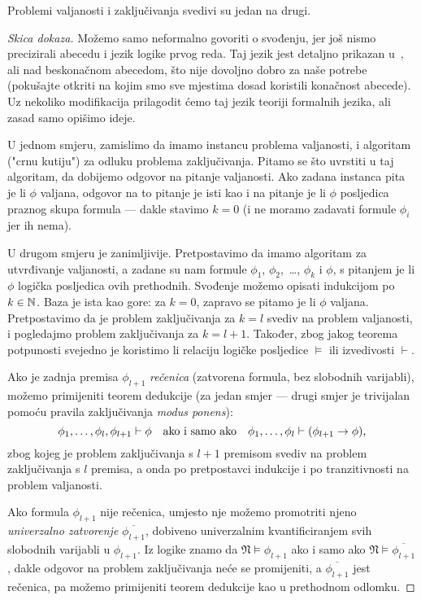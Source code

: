 \begin{propozicija}[{name=[međusobna svedivost valjanosti i zaključivanja]}]\label{pp:valj<>zaklj}
Problemi valjanosti i zaključivanja svedivi su jedan na drugi.
\end{propozicija}
\begin{proof}[Skica dokaza]
Možemo samo neformalno govoriti o svođenju, jer još nismo precizirali abecedu i jezik logike prvog reda. Taj jezik jest detaljno prikazan u~\cite{skr:VukML}, ali nad beskonačnom abecedom, što nije dovoljno dobro za naše potrebe (pokušajte otkriti na kojim smo sve mjestima dosad koristili konačnost abecede). Uz nekoliko modifikacija prilagodit ćemo taj jezik teoriji formalnih jezika, ali zasad samo opišimo ideje.

U jednom smjeru, zamislimo da imamo instancu problema valjanosti, i algoritam ("crnu kutiju") za odluku problema zaključivanja. Pitamo se što uvrstiti u taj algoritam, da dobijemo odgovor na pitanje valjanosti. Ako zadana instanca pita je li $\phi$ valjana, odgovor na to pitanje je isti kao i na pitanje je li $\phi$ posljedica praznog skupa formula --- dakle stavimo $k=0$ (i ne moramo zadavati formule $\phi_i$ jer ih nema).

U drugom smjeru je zanimljivije. Pretpostavimo da imamo algoritam za utvrđivanje valjanosti, a zadane su nam formule $\phi_1$, $\phi_2$,~\ldots, $\phi_k$ i $\phi$, s pitanjem je li $\phi$ logička posljedica ovih prethodnih. Svođenje možemo opisati indukcijom po $k\in{\mathbb N}$. Baza je ista kao gore: za $k=0$, zapravo se pitamo je li $\phi$ valjana. Pretpostavimo da je problem zaključivanja za $k=l$ svediv na problem valjanosti, i pogledajmo problem zaključivanja za $k=l+1$. Također, zbog jakog teorema potpunosti svejedno je koristimo li relaciju logičke posljedice $\models$ ili izvedivosti $\vdash$.

Ako je zadnja premisa $\phi_{l+1}$ \emph{rečenica} (zatvorena formula, bez slobodnih varijabli), možemo primijeniti teorem dedukcije (za jedan smjer --- drugi smjer je trivijalan pomoću pravila zaključivanja \emph{modus ponens}):
\begin{equation}\label{eq:prebaci}
\phi_1,\dotsc,\phi_l,\phi_{l+1}\vdash\phi\text{\quad ako i samo ako\quad}
\phi_1,\dotsc,\phi_l\vdash(\phi_{l+1}\to\phi)\text,
\end{equation}
zbog kojeg je problem zaključivanja s $l+1$ premisom svediv na problem zaključivanja s $l$ premisa, a onda po pretpostavci indukcije i po tranzitivnosti na problem valjanosti.

Ako formula $\phi_{l+1}$ nije rečenica, umjesto nje možemo promotriti njeno \emph{univerzalno zatvorenje} $\overline{\phi_{l+1}}$, dobiveno univerzalnim kvantificiranjem svih slobodnih varijabli u $\phi_{l+1}$. Iz logike znamo da $\mathfrak N\models\phi_{l+1}$ ako i samo ako $\mathfrak N\models\overline{\phi_{l+1}}$, dakle odgovor na problem zaključivanja neće se promijeniti, a $\overline{\phi_{l+1}}$ jest rečenica, pa možemo primijeniti teorem dedukcije kao u prethodnom odlomku.
\end{proof}
